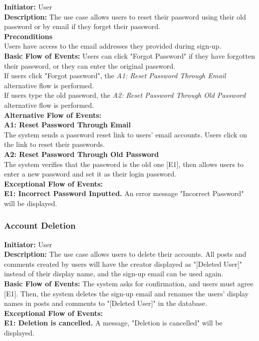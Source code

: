 \documentclass[11pt, a4paper]{article}
\begin{document}
\textbf{Initiator: }User\\
\textbf{Description: }The use case allows users to reset their password using their old password or by email if they forget their password.\\
\textbf{ Preconditions }\\
Users have access to the email addresses they provided during sign-up.\\
\textbf{ Basic Flow of Events: }Users can click "Forgot Password" if they have forgotten their password, or they can enter the original password.\\
If users click "Forgot password", the \textit{A1: Reset Password Through Email} alternative flow is performed.\\
If users type the old password, the \textit{A2: Reset Password Through Old Password} alternative flow is performed.\\
\textbf{ Alternative Flow of Events: }\\
\textbf{A1: Reset Password Through Email}\\
The system sends a password reset link to users' email accounts. Users click on the link to reset their passwords.\\
\textbf{A2: Reset Password Through Old Password}\\
The system verifies that the password is the old one [E1], then allows users to enter a new password and set it as their login password.\\
\textbf{ Exceptional Flow of Events:}\\
\textbf{E1: Incorrect Password Inputted.} An error message "Incorrect Password" will be displayed.


\subsubsection{Account Deletion}

\begin{figure}[H]
    \centering
    
\end{figure}

\textbf{Initiator: }User\\
\textbf{Description: }The use case allows users to delete their accounts. All posts and comments created by users will have the creator displayed as "[Deleted User]" instead of their display name, and the sign-up email can be used again.\\
\textbf{Basic Flow of Events: }The system asks for confirmation, and users must agree [E1]. Then, the system deletes the sign-up email and renames the users' display names in posts and comments to "[Deleted User]" in the database.\\
\textbf{ Exceptional Flow of Events:}\\
\textbf{E1: Deletion is cancelled.} A message, "Deletion is cancelled" will be displayed.\
\end{document}
